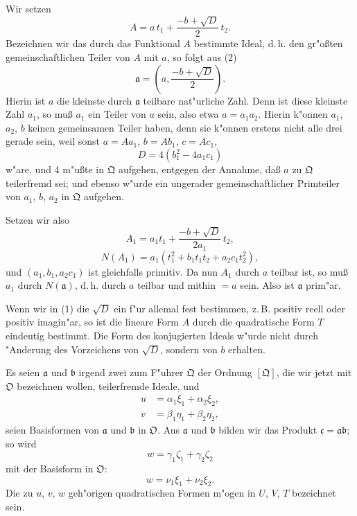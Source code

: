 \documentclass[12pt,a4paper]{article}
\theoremstyle{plain}
\begin{document}
Wir setzen
\begin{equation}
A = a\,t_1 + \frac{-b + \sqrt{D}}{2}\,t_2.
\tag{1}
\end{equation}
Bezeichnen wir das durch das Funktional $A$ bestimmte Ideal, d.\,h. den gr"o\ss ten gemeinschaftlichen Teiler von $A$ mit $a$, so folgt aus (2)
\begin{equation}
\mathfrak{a} = \left(a, \frac{-b + \sqrt{D}}{2}\right).
\tag{4}
\end{equation}
Hierin ist $a$ die kleinste durch $\mathfrak{a}$ teilbare nat"urliche Zahl. Denn ist diese kleinste Zahl $a_1$, so mu\ss{} $a_1$ ein Teiler von $a$ sein, also etwa $a = a_1 a_2$. Hierin k"onnen $a_1$, $a_2$, $b$ keinen gemeinsamen Teiler haben, denn sie k"onnen erstens nicht alle drei gerade sein, weil sonst $a = Aa_1$, $b = Ab_1$, $c = Ac_1$,
\[
D = 4(b_1^2 - 4a_1c_1)
\]
w"are, und 4 m"u\ss te in $\mathfrak{Q}$ aufgehen, entgegen der Annahme, da\ss{} $a$ zu $\mathfrak{Q}$ teilerfremd sei; und ebenso w"urde ein ungerader gemeinschaftlicher Primteiler von $a_1$, $b$, $a_2$ in $\mathfrak{Q}$ aufgehen.

Setzen wir also
\[
A_1 = a_1 t_1 + \frac{-b + \sqrt{D}}{2a_1}\,t_2,
\]
\[
N(A_1) = a_1(t_1^2 + b_1 t_1 t_2 + a_2 c_1 t_2^2),
\]
und $(a_1, b_1, a_2 c_1)$ ist gleichfalls primitiv. Da nun $A_1$ durch $a$ teilbar ist, so mu\ss{} $a_1$ durch $N(\mathfrak{a})$, d.\,h. durch $a$ teilbar und mithin $= a$ sein. Also ist $\mathfrak{a}$ prim"ar.

Wenn wir in (1) die $\sqrt{D}$ ein f"ur allemal fest bestimmen, z.\,B. positiv reell oder positiv imagin"ar, so ist die lineare Form $A$ durch die quadratische Form $T$ eindeutig bestimmt. Die Form des konjugierten Ideals w"urde nicht durch "Anderung des Vorzeichens von $\sqrt{D}$, sondern von $b$ erhalten.

Es seien $\mathfrak{a}$ und $\mathfrak{b}$ irgend zwei zum F"uhrer $\mathfrak{Q}$ der Ordnung $[\mathfrak{Q}]$, die wir jetzt mit $\mathfrak{O}$ bezeichnen wollen, teilerfremde Ideale, und
\begin{equation}
\begin{aligned}
u &= \alpha_1\xi_1 + \alpha_2\xi_2,\\
v &= \beta_1\eta_1 + \beta_2\eta_2,
\end{aligned}
\tag{5}
\end{equation}
seien Basisformen von $\mathfrak{a}$ und $\mathfrak{b}$ in $\mathfrak{O}$. Aus $\mathfrak{a}$ und $\mathfrak{b}$ bilden wir das Produkt $\mathfrak{c} = \mathfrak{a}\mathfrak{b}$; so wird
\[
w = \gamma_1\zeta_1 + \gamma_2\zeta_2
\]
mit der Basisform in $\mathfrak{O}$:
\begin{equation}
w = \nu_1\xi_1 + \nu_2\xi_2.
\tag{6}
\end{equation}
Die zu $u$, $v$, $w$ geh"origen quadratischen Formen m"ogen in $U$, $V$, $T$ bezeichnet sein.
\end{document}
